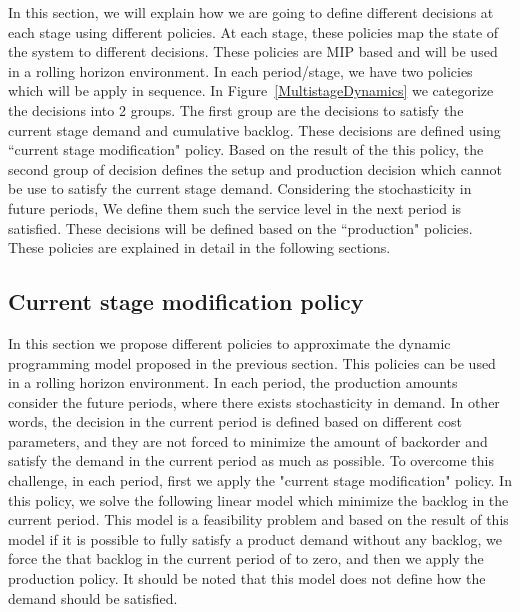 \documentclass[10pt]{article}
\begin{document}
In this section, we will explain how we are going to define different decisions at each stage using different policies. At each stage, these policies map the state of the system to different decisions. These policies are MIP based and will be used in a rolling horizon environment. In each period/stage, we have two policies which will be apply in sequence. 
In Figure~\ref{MultistageDynamics} we categorize the decisions into 2 groups. The first group are the decisions to satisfy the current stage demand and cumulative backlog. These decisions are defined using ``current stage modification" policy.
Based on the result of the this policy, the second group of decision defines the setup and production decision which cannot be use to satisfy the current stage demand. Considering the stochasticity in future periods, We define them such the service level in the next period is satisfied. These decisions will be defined based on the ``production" policies. 
These policies are explained in detail in the following sections. 

 \subsection{Current stage modification policy}
In this section we propose different policies to approximate the dynamic programming model proposed in the previous section. This policies can be used in a rolling horizon environment.
In each period, the production amounts consider the future periods, where there exists stochasticity in demand. 
In other words, the decision in the current period is defined based on different cost parameters, and they are not forced to minimize the amount of backorder and satisfy the demand in the current period as much as possible. 
To overcome this challenge, in each period, first we apply the "current stage modification" policy. In this policy, we solve the following linear model which minimize the backlog in the current period.
This model is a feasibility problem and based on the result of this model if it is possible to fully satisfy a product demand without any backlog, we force the that backlog in the current period of to zero, and then we apply the production policy. It should be noted that this model does not define how the demand should be satisfied. 
\end{document}
